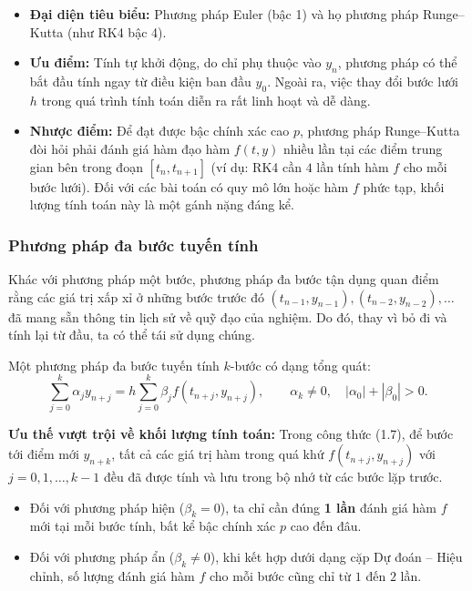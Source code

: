 \begin{itemize}[label=\null]
    \item \textbf{Đại diện tiêu biểu:} Phương pháp Euler (bậc 1) và họ phương pháp Runge--Kutta (như RK4 bậc 4).
    \item \textbf{Ưu điểm:} Tính tự khởi động, do chỉ phụ thuộc vào $y_n$, phương pháp có thể bắt đầu tính ngay từ điều kiện ban đầu $y_0$. Ngoài ra, việc thay đổi bước lưới $h$ trong quá trình tính toán diễn ra rất linh hoạt và dễ dàng.
    \item \textbf{Nhược điểm:} Để đạt được bậc chính xác cao $p$, phương pháp Runge--Kutta đòi hỏi phải đánh giá hàm đạo hàm $f(t, y)$ nhiều lần tại các điểm trung gian bên trong đoạn $[t_n, t_{n+1}]$ (ví dụ: RK4 cần $4$ lần tính hàm $f$ cho mỗi bước lưới). Đối với các bài toán có quy mô lớn hoặc hàm $f$ phức tạp, khối lượng tính toán này là một gánh nặng đáng kể.
\end{itemize}

\subsubsection{Phương pháp đa bước tuyến tính}
Khác với phương pháp một bước, phương pháp đa bước tận dụng quan điểm rằng các giá trị xấp xỉ ở những bước trước đó $(t_{n-1}, y_{n-1}), (t_{n-2}, y_{n-2}), \dots$ đã mang sẵn thông tin lịch sử về quỹ đạo của nghiệm. Do đó, thay vì bỏ đi và tính lại từ đầu, ta có thể tái sử dụng chúng.

Một phương pháp đa bước tuyến tính $k$-bước có dạng tổng quát:
\begin{equation}
    \sum_{j=0}^{k} \alpha_j y_{n+j} = h \sum_{j=0}^{k} \beta_j f(t_{n+j}, y_{n+j}), \qquad \alpha_k \neq 0, \quad |\alpha_0| + |\beta_0| > 0. \tag{1.7}
\end{equation}

\textbf{Ưu thế vượt trội về khối lượng tính toán:} 
Trong công thức (1.7), để bước tới điểm mới $y_{n+k}$, tất cả các giá trị hàm trong quá khứ $f(t_{n+j}, y_{n+j})$ với $j = 0, 1, \dots, k-1$ đều đã được tính và lưu trong bộ nhớ từ các bước lặp trước. 
\begin{itemize}[label=\null]
    \item Đối với phương pháp hiện ($\beta_k = 0$), ta chỉ cần đúng \textbf{1 lần} đánh giá hàm $f$ mới tại mỗi bước tính, bất kể bậc chính xác $p$ cao đến đâu.
    \item Đối với phương pháp ẩn ($\beta_k \neq 0$), khi kết hợp dưới dạng cặp Dự đoán -- Hiệu chỉnh, số lượng đánh giá hàm $f$ cho mỗi bước cũng chỉ từ $1$ đến $2$ lần.
\end{itemize}

